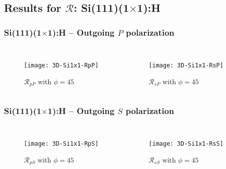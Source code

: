 \documentclass{beamer}
\begin{document}



\subsection{Results for \texorpdfstring{$\mathcal{R}$}{R}: 
Si(111)(1\texorpdfstring{$\times$}{x}1):H}

\begin{frame}
\frametitle{Si(111)(1\texorpdfstring{$\times$}{x}1):H -- Outgoing
\texorpdfstring{$P$}{P} polarization}
\begin{columns}
\begin{figure}
\centering
\texttt{[image: 3D-Si1x1-RpP]}
\caption{$\mathcal{R}_{pP}$ with $\phi=45$}
\end{figure}
\begin{figure}
\centering
\texttt{[image: 3D-Si1x1-RsP]}
\caption{$\mathcal{R}_{sP}$ with $\phi=45$}
\end{figure}
\end{columns}
\end{frame}

\begin{frame}
\frametitle{Si(111)(1\texorpdfstring{$\times$}{x}1):H -- Outgoing
\texorpdfstring{$S$}{S} polarization}
\begin{columns}
\begin{figure}
\centering
\texttt{[image: 3D-Si1x1-RpS]}
\caption{$\mathcal{R}_{pS}$ with $\phi=45$}
\end{figure}
\begin{figure}
\centering
\texttt{[image: 3D-Si1x1-RsS]}
\caption{$\mathcal{R}_{sS}$ with $\phi=45$}
\end{figure}
\end{columns}
\end{frame}
\end{document}
